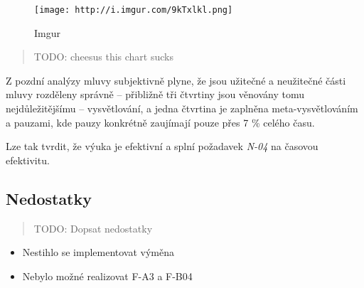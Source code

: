 \begin{figure}
\centering
\texttt{[image: http://i.imgur.com/9kTxlkl.png]}
\caption{Imgur}
\end{figure}

\begin{quote}
TODO: cheesus this chart sucks
\end{quote}

Z pozdní analýzy mluvy subjektivně plyne, že jsou užitečné a neužitečné
části mluvy rozděleny správně -- přibližně tři čtvrtiny jsou věnovány
tomu nejdůležitějšímu -- vysvětlování, a jedna čtvrtina je zaplněna
meta-vysvětlováním a pauzami, kde pauzy konkrétně zaujímají pouze přes 7
\% celého času.

Lze tak tvrdit, že výuka je efektivní a splní požadavek \emph{N-04} na
časovou efektivitu.

\subsection{Nedostatky}\label{nedostatky}

\begin{quote}
TODO: Dopsat nedostatky
\end{quote}

\begin{itemize}
\tightlist
\item
  Nestihlo se implementovat výměna
\item
  Nebylo možné realizovat F-A3 a F-B04
\end{itemize}
